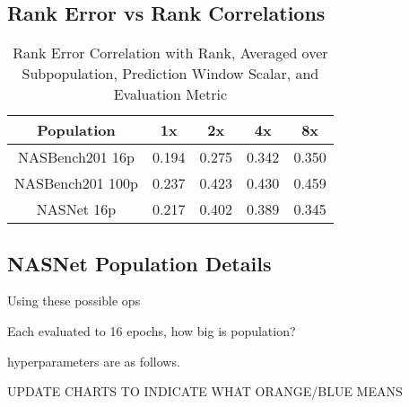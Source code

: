 \documentclass[twocolumn]{article}
\begin{document}
\FloatBarrier
\clearpage
\subsection{Rank Error vs Rank Correlations}

\begin{table}[!h]
    \begin{center}
        \begin{tabular}{c | c | c | c | c}
            \toprule
            Population          & 1x    & 2x    &4x     & 8x    \\
            \midrule
            NASBench201 16p     & 0.194 & 0.275 & 0.342 & 0.350 \\
            NASBench201 100p    & 0.237 & 0.423 & 0.430 & 0.459 \\
            NASNet 16p          & 0.217 & 0.402 & 0.389 & 0.345 \\
            \bottomrule
        \end{tabular}
        \caption{Rank Error Correlation with Rank, Averaged over Subpopulation, Prediction Window Scalar, and Evaluation Metric}
        \label{table:rank_error_corr}
    \end{center}
\end{table}

%        
%
%        

%        


\FloatBarrier
\subsection{NASNet Population Details}

Using these possible ops

Each evaluated to 16 epochs, how big is population?

hyperparameters are as follows.

UPDATE CHARTS TO INDICATE WHAT ORANGE/BLUE MEANS
\end{document}
